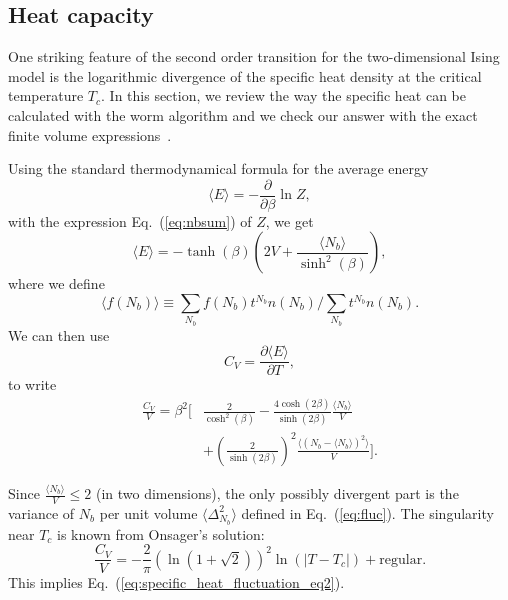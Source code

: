 \documentclass[../main.tex]{subfiles}
\begin{document}
\subsection{Heat capacity}%
\label{ssec:heat_capacity}
One striking feature of the second order transition for the two-dimensional Ising model is the logarithmic divergence
of the specific heat density at the critical temperature $T_c$. In this section, we review the way the specific heat
can be calculated with the worm algorithm and we check our answer with the exact finite volume
expressions~\cite{bkaufman}.

Using the standard thermodynamical formula for the average energy
\begin{equation}
    \langle E \rangle = - \frac{\partial}{\partial \beta} \ln Z,
\end{equation}
with the expression Eq.~(\ref{eq:nbsum}) of  $Z$, we get
\begin{equation}
    \langle E \rangle = - \tanh(\beta)\left(2V + \frac{\langle
    N_b\rangle}{\sinh^2(\beta)}\right),
\end{equation}
where we define
\begin{equation}
\langle f(N_b)\rangle \equiv \sum_{N_b} f(N_b)t^{N_b}  n(N_b)/\sum_{N_b}t^{N_b}
n(N_b).
\end{equation}
We can then use
\begin{equation}
    C_{V} = \frac{\partial \langle E \rangle}{\partial T},
\end{equation}
to write
\begin{align}
    \frac{C_V}{V} = \beta^2 \bigg[&\frac{2}{\cosh^2(\beta)} -
        \frac{4\cosh(2\beta)}{\sinh(2\beta)} \frac{\langle N_b\rangle}{V} \\
    &+ \left(\frac{2}{\sinh(2\beta)}\right)^2\frac{\langle(N_b - \langle
    N_b\rangle)^2\rangle}{V} \bigg].
\end{align}

Since $\frac{\langle N_b\rangle}{V}\leq 2$ (in two dimensions), the only possibly divergent part is the variance of
$N_b$ per unit volume $\langle \Delta_{N_b}^2\rangle$ defined in Eq.~(\ref{eq:fluc}). The singularity near $T_c$ is
known from Onsager's solution:
\begin{equation}
    \frac{C_V}{V} = -\frac{2}{\pi}\left(\ln(1+\sqrt{2})\right)^2
        \ln\left(|T - T_c|\right) + \text{regular}.
    \label{eq:onsager}
\end{equation}
This implies Eq.~(\ref{eq:specific_heat_fluctuation_eq2}).
\end{document}
